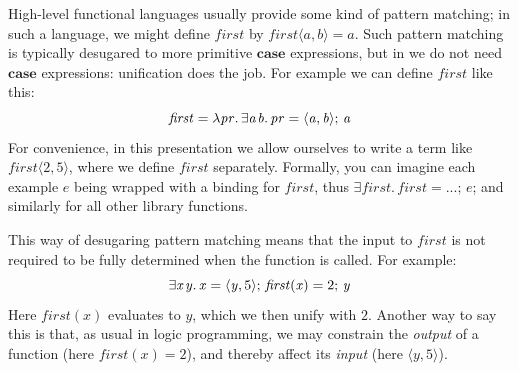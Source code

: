 \documentclass[acmsmall,review,anonymous,dvipsnames]{acmart}
\newcommand{\Varid}[1]{\mathit{#1}}
\begin{document}
High-level functional languages usually provide some kind of
pattern matching; in such a language, we might define \ensuremath{\Varid{first}} by
\ensuremath{\Varid{first}\langle\Varid{a},\Varid{b}\rangle\mathrel{=}\Varid{a}}. Such pattern matching is typically desugared to
more primitive \ensuremath{\textbf{case}} expressions, but in \versecalc{} we do not need \ensuremath{\textbf{case}} expressions:
unification does the job.  For example we can define \ensuremath{\Varid{first}} like this:
$$
\ensuremath{\Varid{first}\mathrel{=}\lambda\Varid{pr}.\,\exists\Varid{a}\hspace{0.3mm}\Varid{b}.\,\Varid{pr}\mathrel{=}\langle{}\Varid{a},\Varid{b}\rangle;\,\Varid{a}}
$$
For convenience, in this presentation we allow ourselves to write a term like
\ensuremath{\Varid{first}\langle\mathrm{2},\mathrm{5}\rangle}, where we define \ensuremath{\Varid{first}} separately. Formally, you can imagine
each example \ensuremath{\Varid{e}} being wrapped with a binding for \ensuremath{\Varid{first}}, thus \ensuremath{\exists\Varid{first}.\,\Varid{first}\mathrel{=}\mathbin{...};\,\Varid{e}};
and similarly for all other library functions.

This way of desugaring pattern matching means that the input
to \ensuremath{\Varid{first}} is not required to be fully determined when the function is called. For example:
$$
\ensuremath{\exists\Varid{x}\hspace{0.3mm}\Varid{y}.\,\Varid{x}\mathrel{=}\langle{}\Varid{y},\mathrm{5}\rangle;\,\Varid{first}(\Varid{x})\mathrel{=}\mathrm{2};\,\Varid{y}}
$$
Here \ensuremath{\Varid{first}(\Varid{x})} evaluates to \ensuremath{\Varid{y}}, which we then unify with \ensuremath{\mathrm{2}}.
Another way to say this is that, as usual in logic programming, we may
constrain the \emph{output} of a function (here \ensuremath{\Varid{first}(\Varid{x})\mathrel{=}\mathrm{2}}), and thereby
affect its \emph{input} (here \ensuremath{\langle{}\Varid{y},\mathrm{5}\rangle}).
\end{document}
